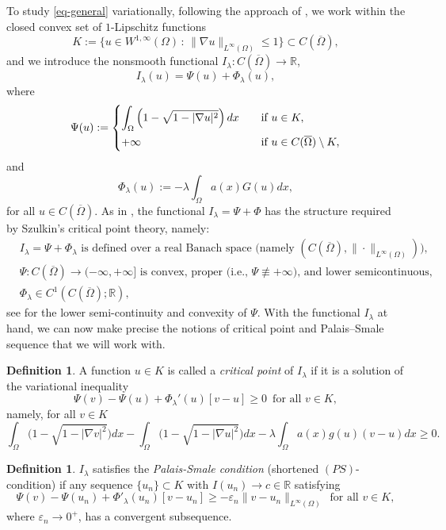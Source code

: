 \documentclass[11pt,reqno]{amsart}
\theoremstyle{plain}
\theoremstyle{definition}
\newtheorem{definition}[theorem]{Definition}
\numberwithin{equation}{section}
\newcommand{\R}{\mathbb{R}}
\begin{document}
To study \eqref{eq-general} variationally, following the approach of \cite{BeJeMa14}, we work within the closed convex set of $1$-Lipschitz functions
$$K := \{ u \in W^{1,\infty}(\Omega) \, \colon \, \|\nabla u \|_{L^\infty(\Omega)} \leq 1 \} \subset C(\overline\Omega),$$
and we introduce the nonsmooth functional $I_\lambda \colon C(\overline\Omega) \to \R$,
\begin{equation}
    \label{functional}
    I_\lambda(u) = \Psi(u) + \Phi_\lambda(u),
\end{equation}
where
$$\Psi(u) := 
\begin{cases}
        \displaystyle \int_\Omega \left( 1- \sqrt{1-|\nabla u|^2} \right) dx \quad &\text{if } u \in K, \smallskip \\
        \displaystyle 
        + \infty &\text{if } u \in C(\overline{\Omega}) \setminus K,
\end{cases}
    $$ 
and 
$$\Phi_\lambda(u) := - \lambda \int_\Omega a(x)G(u) dx,$$
for all $u\in C(\overline{\Omega})$. As in \cite{BeJeMa14,Sz86}, the functional $I_\lambda=\Psi+\Phi$ has the structure required by Szulkin's critical point theory, namely: 
$$
\begin{aligned}  
&I_{\lambda} = \Psi + \Phi_{\lambda} \text{ is defined over a real Banach space (namely $(C(\overline{\Omega}),\|\cdot\|_{L^\infty(\Omega)})$)},\\   
&\Psi : C(\overline{\Omega}) \to (-\infty, +\infty] \text{ is convex, proper (i.e., $\Psi \not\equiv +\infty$), and lower semicontinuous},\\
&\Phi_{\lambda} \in C^1(C(\overline{\Omega});\mathbb{R}), 
\end{aligned} 
$$
see \cite[Lemma 2.4]{BeJeMa14} for the lower semi-continuity and convexity of $\Psi$. With the functional $I_\lambda$ at hand, we can now make precise the notions of critical point and Palais--Smale sequence that we will work with.

\begin{definition}\label{def:crit-pt}
A function $u \in K$ is called a \emph{critical point} of $I_\lambda$ if it is a solution of the variational inequality
$$
\Psi(v) - \Psi(u) + \Phi_\lambda'(u)[v-u]  \geq 0 \, \text{ for all } v \in K,
$$
namely, for all $v \in K$
$$
\int_\Omega \big( 1- \sqrt{1-|\nabla v|^2} \big)dx - \int_\Omega \big( 1- \sqrt{1-|\nabla u|^2} \big)dx- \lambda \int_\Omega a(x)g(u)(v-u)dx \geq 0. 
$$
\end{definition}
\begin{definition}\label{def:PS}
$I_\lambda$ satisfies the \emph{Palais-Smale condition} (shortened $(PS)$-condition) if any sequence $\{u_n\} \subset K$ with $I(u_n)\to c\in\mathbb R$ satisfying 
\begin{equation}
\label{ineq:PS}
\Psi(v) - \Psi(u_n) + \Phi'_\lambda(u_n)[v-u_n] \geq -\varepsilon_n\|v-u_n\|_{L^\infty(\Omega)} \, \text{ for all } v \in K, 
\end{equation}
where $\varepsilon_n \to 0^+$, has a convergent subsequence. 
\end{definition}
\end{document}

